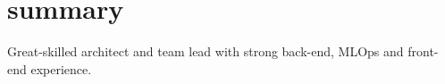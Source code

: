 \section{summary}

Great-skilled architect and team lead with strong back-end, MLOps and front-end experience.
